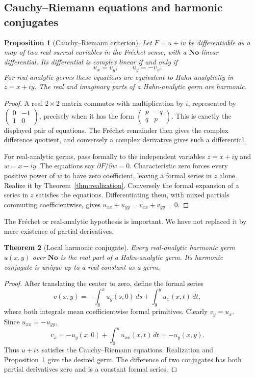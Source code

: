 \documentclass[11pt,a4paper]{article}
\numberwithin{equation}{section}
\newtheorem{theorem}{Theorem}[section]
\newtheorem{proposition}[theorem]{Proposition}
\theoremstyle{definition}
\theoremstyle{remark}
\newcommand{\No}{\mathbf{No}}
\begin{document}
\subsection{Cauchy--Riemann equations and harmonic conjugates}
\begin{proposition}[Cauchy--Riemann criterion]
\label{prop:CR}
Let $F=u+iv$ be differentiable as a map of two real surreal variables in the Fr\'echet sense, with a $\No$-linear differential. Its differential is complex linear if and only if
\[
 u_x=v_y,\qquad u_y=-v_x.
\]
For real-analytic germs these equations are equivalent to Hahn analyticity in $z=x+iy$. The real and imaginary parts of a Hahn-analytic germ are harmonic.
\end{proposition}
\begin{proof}
A real $2\times2$ matrix commutes with multiplication by $i$, represented by
$\left(\begin{smallmatrix}0&-1\\1&0\end{smallmatrix}\right)$, precisely when it has the form
$\left(\begin{smallmatrix}p&-q\\q&p\end{smallmatrix}\right)$. This is exactly the displayed pair of equations. The Fr\'echet remainder then gives the complex difference quotient, and conversely a complex derivative gives such a differential.

For real-analytic germs, pass formally to the independent variables $z=x+iy$ and $w=x-iy$. The equations say $\partial F/\partial w=0$. Characteristic zero forces every positive power of $w$ to have zero coefficient, leaving a formal series in $z$ alone. Realize it by Theorem~\ref{thm:realization}. Conversely the formal expansion of a series in $z$ satisfies the equations. Differentiating them, with mixed partials commuting coefficientwise, gives $u_{xx}+u_{yy}=v_{xx}+v_{yy}=0$.
\end{proof}
The Fr\'echet or real-analytic hypothesis is important. We have not replaced it by mere existence of partial derivatives.

\begin{theorem}[Local harmonic conjugate]
Every real-analytic harmonic germ $u(x,y)$ over $\No$ is the real part of a Hahn-analytic germ. Its harmonic conjugate is unique up to a real constant as a germ.
\end{theorem}
\begin{proof}
After translating the center to zero, define the formal series
\[
 v(x,y)=-\int_0^x u_y(s,0)\,ds+\int_0^y u_x(x,t)\,dt,
\]
where both integrals mean coefficientwise formal primitives. Clearly $v_y=u_x$. Since $u_{xx}=-u_{yy}$,
\[
 v_x=-u_y(x,0)+\int_0^y u_{xx}(x,t)\,dt=-u_y(x,y).
\]
Thus $u+iv$ satisfies the Cauchy--Riemann equations. Realization and Proposition~\ref{prop:CR} give the desired germ. The difference of two conjugates has both partial derivatives zero and is a constant formal series.
\end{proof}
\end{document}

